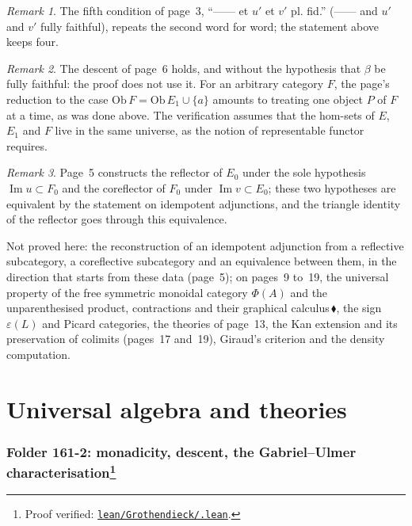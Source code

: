 \documentclass[11pt]{article}
\newcommand{\q}[1]{“#1”}
\newcommand{\verifie}[1]{\footnote{Proof verified: \href{https://github.com/Commutator-IO/grothendieck-project/blob/article-lean-2026-10/lean/Grothendieck/#1.lean}{\texttt{lean/Grothendieck/\detokenize{#1}.lean}}.}}
\newcommand{\piste}[1]{\,\href{https://grothendieck.commutator.io/findings/\##1}{\textcolor{piste}{\ensuremath{\blacklozenge}}}}
\theoremstyle{plain}
\theoremstyle{definition}
\theoremstyle{remark}
\newtheorem*{remarque}{Remark}
\begin{document}
\begin{remarque}
The fifth condition of page~3, \q{—— et $u'$ et $v'$ pl. fid.} (—— and $u'$ and $v'$ fully faithful), repeats the second word for word; the statement above keeps four.
\end{remarque}

\begin{remarque}
The descent of page~6 holds, and without the hypothesis that $\beta$ be fully faithful: the proof does not use it. For an arbitrary category $F$, the page's reduction to the case $\mathrm{Ob}\,F = \mathrm{Ob}\,E_1 \cup \{a\}$ amounts to treating one object $P$ of $F$ at a time, as was done above. The verification assumes that the hom-sets of $E$, $E_1$ and $F$ live in the same universe, as the notion of representable functor requires.
\end{remarque}

\begin{remarque}
Page~5 constructs the reflector of $E_0$ under the sole hypothesis $\operatorname{Im} u \subset F_0$ and the coreflector of $F_0$ under $\operatorname{Im} v \subset E_0$; these two hypotheses are equivalent by the statement on idempotent adjunctions, and the triangle identity of the reflector goes through this equivalence.
\end{remarque}

\noindent Not proved here: the reconstruction of an idempotent adjunction from a reflective subcategory, a coreflective subcategory and an equivalence between them, in the direction that starts from these data (page~5); on pages~9 to~19, the universal property of the free symmetric monoidal category $\Phi(A)$ and the unparenthesised product, contractions and their graphical calculus\piste{161-1-contractions-string-calculus}, the sign $\varepsilon(L)$ and Picard categories, the theories of page~13, the Kan extension and its preservation of colimits (pages~17 and~19), Giraud's criterion and the density computation.

\part{Universal algebra and theories}

\section[Folder 161-2: monadicity, descent, the Gabriel--Ulmer characterisation]{Folder 161-2: monadicity, descent, the Gabriel--Ulmer characterisation\protect\verifie{Folder161_2}}\label{sec:161-2}
\end{document}
